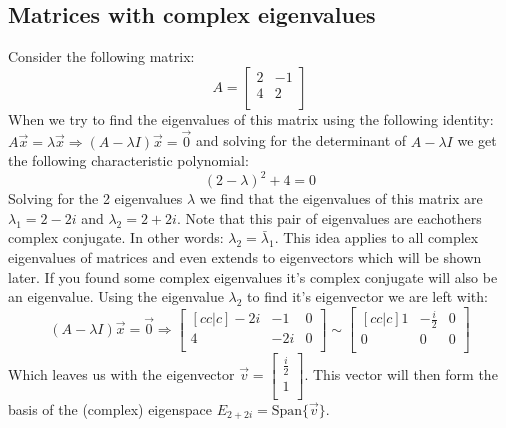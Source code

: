 \documentclass[11pt, a4paper]{article}
\begin{document}
\subsection{Matrices with complex eigenvalues}
Consider the following matrix:
\begin{equation*}
  A = 
  \begin{bmatrix}
    2 & -1\\
    4 & 2\\
  \end{bmatrix}
\end{equation*}
When we try to find the eigenvalues of this matrix using the following identity: $A\vec{x} = \lambda \vec{x} \Rightarrow (A-\lambda I)\vec{x} = \vec{0}$ and solving for the determinant of $A-\lambda I$ we get the following characteristic polynomial:
\begin{equation*}
  (2 - \lambda)^2 + 4 = 0
\end{equation*}
Solving for the 2 eigenvalues $\lambda$ we find that the eigenvalues of this matrix are $\lambda_1 = 2 - 2i$ and $\lambda_2 = 2 + 2i$. Note that this pair of eigenvalues are eachothers complex conjugate. In other words: $\lambda_2 = \bar{\lambda}_1$. This idea applies to all complex eigenvalues of matrices and even extends to eigenvectors which will be shown later. If you found some complex eigenvalues it's complex conjugate will also be an eigenvalue. Using the eigenvalue $\lambda_2$ to find it's eigenvector we are left with:
\begin{equation*}
  (A-\lambda I)\vec{x} = \vec{0} \Rightarrow 
  \begin{bmatrix}[cc|c]
    -2i & -1  & 0\\
    4   & -2i & 0\\
  \end{bmatrix}
  \sim
  \begin{bmatrix}[cc|c]
    1   & -\frac{i}{2}  & 0\\
    0   & 0             & 0\\
  \end{bmatrix}
\end{equation*}
Which leaves us with the eigenvector $\vec{v} = \begin{bmatrix} \frac{i}{2} \\ 1\\ \end{bmatrix}$. This vector will then form the basis of the (complex) eigenspace $E_{2 + 2i} = \text{Span}\{ \vec{v} \}$.
\end{document}
